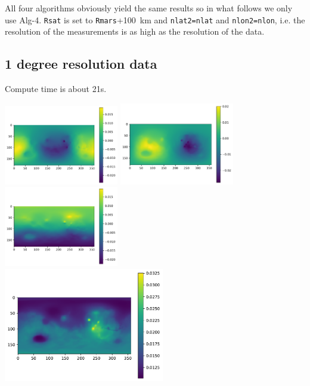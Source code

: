 All four algorithms obviously yield the same results so in what follows we 
only use Alg-4. \lstinline{Rsat} is set to \lstinline{Rmars}+100~km and \lstinline{nlat2=nlat}
and \lstinline{nlon2=nlon}, i.e. the resolution of the measurements is as high as the 
resolution of the data.

\newpage
\subsection*{1 degree resolution data}

Compute time is about 21s. 

\begin{center}
\includegraphics[width=5cm]{python_codes/fieldstone_100/results/one/gx}
\includegraphics[width=5cm]{python_codes/fieldstone_100/results/one/gy}
\includegraphics[width=5cm]{python_codes/fieldstone_100/results/one/gz}\\
\includegraphics[width=7cm]{python_codes/fieldstone_100/results/one/gg}

\end{center}

